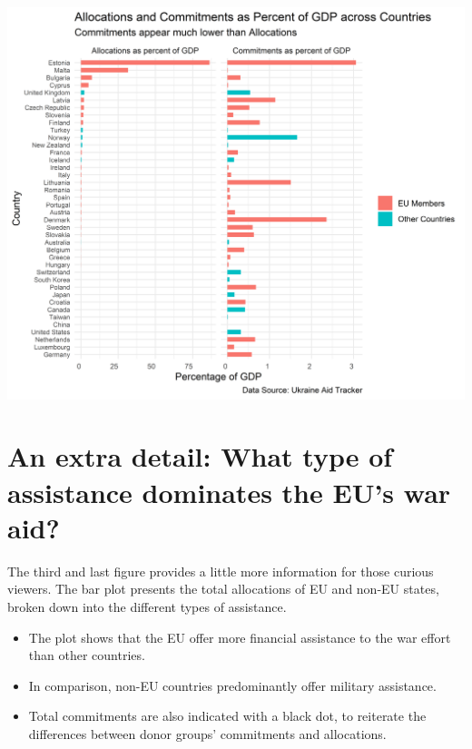 \documentclass[11pt,preprint, authoryear]{elsarticle}
\let\origfigure\figure
\let\endorigfigure\endfigure
\renewenvironment{figure}[1][2] {
    \expandafter\origfigure\expandafter[H]
} {
    \endorigfigure
}
\numberwithin{equation}{section}
\numberwithin{figure}{section}
\numberwithin{table}{section}
\begin{document}
\begin{figure}[H]

{\centering \includegraphics{Question_3_files/figure-latex/Figure2-1} 

}

\caption{Percent GDP \label{Figure2}}\label{fig:Figure2}
\end{figure}

\hypertarget{an-extra-detail-what-type-of-assistance-dominates-the-eus-war-aid}{%
\section{\texorpdfstring{An extra detail: What type of assistance
dominates the EU's war aid?
\label{aid_type}}{An extra detail: What type of assistance dominates the EU's war aid? }}\label{an-extra-detail-what-type-of-assistance-dominates-the-eus-war-aid}}

The third and last figure provides a little more information for those
curious viewers. The bar plot presents the total allocations of EU and
non-EU states, broken down into the different types of assistance.

\begin{itemize}
\item
  The plot shows that the EU offer more financial assistance to the war
  effort than other countries.
\item
  In comparison, non-EU countries predominantly offer military
  assistance.
\item
  Total commitments are also indicated with a black dot, to reiterate
  the differences between donor groups' commitments and allocations.
\end{itemize}
\end{document}
